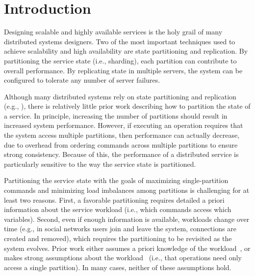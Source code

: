 \section{Introduction}

Designing scalable and highly available services is the holy grail of
many distributed systems designers.  Two of the most important
techniques used to achieve scalability and high availability are state
partitioning and replication.  By partitioning the service state
(i.e., sharding), each partition can contribute to overall
performance. By replicating state in multiple servers, the
system can be configured to tolerate any number of server failures.


Although many distributed systems rely on state partitioning and
replication (e.g., \cite{x,y,z,w}), there is relatively little prior
work describing how to partition the state of a service.  In
principle, increasing the number of partitions should result in
increased system performance. However, if executing an operation
requires that the system access multiple partitions, then performance
can actually decrease, due to overhead from ordering commands across
multiple partitions to ensure strong consistency. Because of this, 
the performance of a distributed service is particularly
sensitive to the way the service state is partitioned.




Partitioning the service state with the goals of maximizing
single-partition commands and minimizing load imbalances among
partitions is challenging for at least two reasons.  First, a
favorable partitioning requires detailed a priori information about
the service workload (i.e., which commands access which variables).
Second, even if enough information is available, workloads change over
time (e.g., in social networks users join and leave the system,
connections are created and removed), which requires the partitioning
to be revisited as the system evolves.  Prior work either assumes a
priori knowledge of the workload~\cite{curino2010sch}, or makes strong
assumptions about the workload~\cite{long16} (i.e., that operations
need only access a single partition). In many cases, neither of these
assumptions hold.


